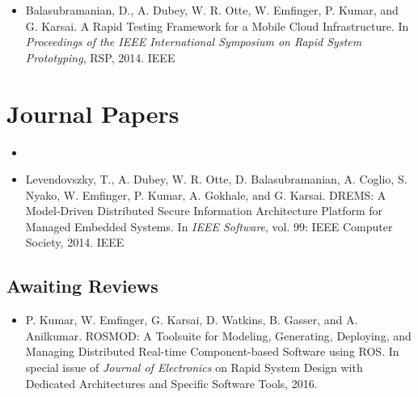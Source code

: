 \begin{appendices}
\begin{itemize}
	\item Balasubramanian, D., A. Dubey, W. R. Otte, W. Emfinger, P. Kumar, and G. Karsai. A Rapid Testing Framework for a Mobile Cloud Infrastructure.  In \textit{Proceedings of the IEEE International Symposium on Rapid System Prototyping}, RSP, 2014. IEEE
	
\end{itemize}

\section{Journal Papers}
\begin{itemize}
	\item {}
	
	\item Levendovszky, T., A. Dubey, W. R. Otte, D. Balasubramanian, A. Coglio, S. Nyako, W. Emfinger, P. Kumar, A. Gokhale, and G. Karsai. DREMS: A Model-Driven Distributed Secure Information Architecture Platform for Managed Embedded Systems. In \textit{IEEE Software}, vol. 99: IEEE Computer Society, 2014. IEEE	
\end{itemize}

\subsection{Awaiting Reviews}
\begin{itemize}
	\item P. Kumar, W. Emfinger, G. Karsai, D. Watkins, B. Gasser, and A. Anilkumar. ROSMOD: A Toolsuite for Modeling, Generating, Deploying, and Managing Distributed Real-time Component-based Software using ROS. In special issue of \textit{Journal of Electronics} on Rapid System Design with Dedicated Architectures and Specific Software Tools, 2016.
\end{itemize}

\end{appendices}

